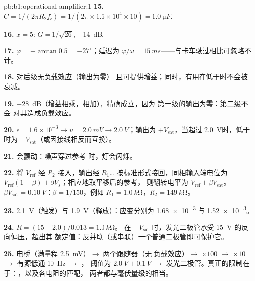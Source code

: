 \begin{solution}{pb:b1:operational-amplifier:1}
\textbf{15.} $C = 1/(2\pi R_2f_c) = 1/(2\pi \times 1.6\times10^4 \times 10)
= \qty{1.0}{\micro F}$.

\textbf{16.} $x = 5$: $G = 1/\sqrt{26}$, \qty{-14}{dB}.

\textbf{17.} $\varphi = -\arctan 0.5 = -27^\circ$；延迟为 $\varphi/\omega =
\qty{15}{ms}$——与卡车驶过相比可忽略不计。

\textbf{18.} 对后级无负载效应（输出为零）
且可提供增益；同时，有用在低于时不会被衰减。

\textbf{19.} \qty{-28}{dB}（增益相乘，相加），精确成立，因为
第一级的输出为零：第二级不会
对其造成负载效应。

\textbf{20.} $\epsilon = 1.6\times10^{-3} \to u = \qty{2.0}{mV} \to
\qty{2.0}{V}$；输出为 $+V_{\mathrm{sat}}$，当超过
\qty{2.0}{V}时，低于时为 $-V_{\mathrm{sat}}$（或因接线相反而互换）。

\textbf{21.} 会颤动：噪声穿过参考
时，灯会闪烁。

\textbf{22.} 将 $V_{\mathrm{ref}}$ 经 $R_2$ 接入，输出经
$R_1$\dots{} 按标准形式接回，同相输入端电位为
$V_{\mathrm{ref}}(1 - \beta) + \beta V_s$；相应地取平移后的参考，
则翻转电平为 $V_{\mathrm{ref}} \pm \beta V_{\mathrm{sat}}$。
$\beta V_{\mathrm{sat}} = \qty{0.10}{V}$：$\beta = 1/150$，例如 $R_1 =
\qty{1.0}{k\ohm}$，$R_2 = \qty{149}{k\ohm}$。

\textbf{23.} \qty{2.1}{V}（触发）与 \qty{1.9}{V}（释放）：应变分别为
\num{1.68e-3} 与 \num{1.52e-3}。

\textbf{24.} $R = (15 - 2.0)/0.013 = \qty{1.0}{k\ohm}$。
在 $-V_{\mathrm{sat}}$ 时，发光二极管承受 \qty{15}{V} 的反向偏压，超出其
额定值：反并联（或串联）一个普通二极管即可保护它。

\textbf{25.} 电桥（满量程 \qty{2.5}{mV}）$\to$ 两个跟随器（无
负载效应）$\to$  $\times100$ $\to$  $\times10$ $\to$ 有源低通 \qty{10}{Hz} $\to$ ，
阈值为 $\qty{2.0}{V} \pm \qty{0.1}{V}$ $\to$ 发光二极管。真正的限制在于：，以及各电阻的匹配，
两者都与毫伏量级的相当。
\end{solution}
